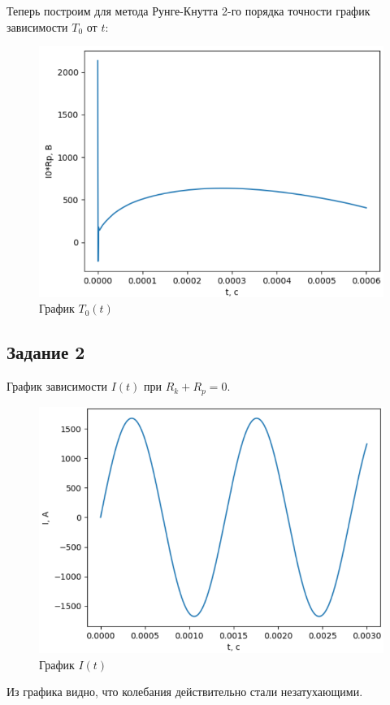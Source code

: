 Теперь построим для метода Рунге-Кнутта 2-го порядка точности график зависимости $T_0$ от $t$:
\begin{figure}[h!]
	\includegraphics[scale=0.45]{img/6.png}
	\caption{График $T_0(t)$}
\end{figure}
\newpage
\subsection*{Задание 2}
График зависимости $I(t)$ при $R_k+R_p=0$.
\begin{figure}[h!]
	\includegraphics[scale=0.6]{img/7.png}
	\caption{График $I(t)$}
\end{figure}
\newline Из графика видно, что колебания действительно стали незатухающими.
